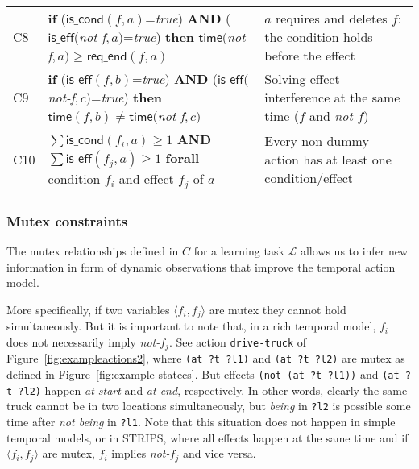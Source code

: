 \documentclass{ecai}
\newcommand{\tup}[1]{{\langle #1 \rangle}}
\newcommand{\iscond}{\mathsf{is\_cond}}    %
\newcommand{\iseff}{\mathsf{is\_eff}}    %
\newcommand{\tim}{\mathsf{time}}   %
\newcommand{\reqe}{\mathsf{req\_{end}}}   %
\begin{document}
\begin{table*}
\begin{center}
\begin{scriptsize}
\begin{tabular}{lp{10.4cm}p{6.6cm}}
C8& \textbf{if} ($\iscond(f,a)$=\textit{true}) \textbf{AND} ($\iseff($\textit{not-f}$,a)$=\textit{true}) \textbf{then} $\tim($\textit{not-f}$,a) \geq \reqe(f,a)$ & $a$ requires and deletes $f$: the condition holds before the effect \\ 

C9& \textbf{if} ($\iseff(f,b)$=\textit{true}) \textbf{AND} ($\iseff($\textit{not-f}$,c)$=\textit{true}) \textbf{then} $\tim(f,b) \neq \tim($\textit{not-f}$,c)$ & Solving effect interference at the same time ($f$ and \textit{not-}$f$) \\

C10& $\sum \iscond(f_i,a) \geq 1$ \textbf{AND} $\sum \iseff(f_j,a) \geq 1$ \textbf{forall} condition $f_i$ and effect $f_j$ of $a$ & Every non-dummy action has at least one condition/effect \\

\end{tabular}
\end{scriptsize}	
\label{table:constraints}
\end{center}	
\end{table*}


\subsubsection{Mutex constraints}
The mutex relationships defined in $C$ for a learning task $\mathcal{L}$ allows us to infer new information in form of dynamic observations that improve the temporal action model.

More specifically, if two variables $\tup{f_i, f_j}$ are mutex they cannot hold simultaneously. But it is important to note that, in a rich temporal model, $f_i$ does not necessarily imply \textit{not-}$f_j$.
See action \texttt{drive-truck} of Figure~\ref{fig:exampleactions2}, where \texttt{(at ?t ?l1)} and \texttt{(at ?t ?l2)} are mutex as defined in Figure~\ref{fig:example-statecs}. But effects \texttt{(not (at ?t ?l1))} and \texttt{(at ?t ?l2)} happen \textit{at start} and \textit{at end}, respectively. In other words, clearly the same truck cannot be in two locations simultaneously, but \textit{being} in \texttt{?l2} is possible some time after \textit{not being} in \texttt{?l1}. Note that this situation does not happen in simple temporal models, or in STRIPS, where all effects happen at the same time and if $\tup{f_i, f_j}$ are mutex, $f_i$ implies \textit{not-}$f_j$ and vice versa.
\end{document}
